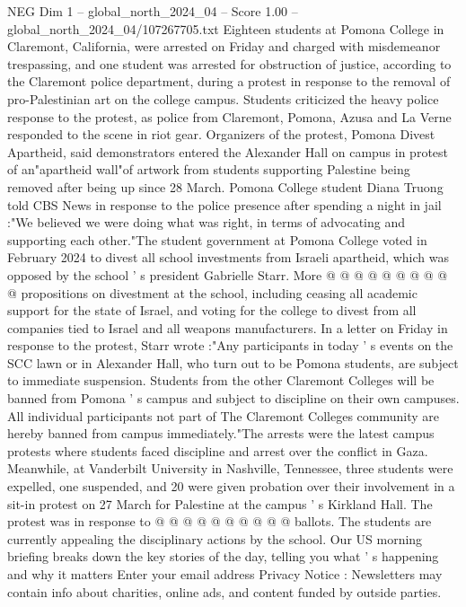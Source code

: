 \begin{textsample}{NEG Dim 1 – global\_north\_2024\_04 – Score 1.00 – global\_north\_2024\_04/107267705.txt}  \label{ex:f1_neg_252}
Eighteen students at Pomona College in Claremont, California, were arrested on Friday and charged with misdemeanor trespassing, and one student was arrested for obstruction of justice, according to the Claremont police department, during a protest in response to the removal of pro-Palestinian art on the college campus.
Students criticized the heavy police response to the protest, as police from Claremont, Pomona, Azusa and La Verne responded to the scene in riot gear.
Organizers of the protest, Pomona Divest Apartheid, said demonstrators entered the Alexander Hall on campus in protest of an"apartheid wall"of artwork from students supporting Palestine being removed after being up since 28 March.
Pomona College student Diana Truong told CBS News in response to the police presence after spending a night in jail :"We believed we were doing what was right, in terms of advocating and supporting each other."The student government at Pomona College voted in February 2024 to divest all school investments from Israeli apartheid, which was opposed by the school ' s president Gabrielle Starr.
More @ @ @ @ @ @ @ @ @ @ propositions on divestment at the school, including ceasing all academic support for the state of Israel, and voting for the college to divest from all companies tied to Israel and all weapons manufacturers.
In a letter on Friday in response to the protest, Starr wrote :"Any participants in today ' s events on the SCC lawn or in Alexander Hall, who turn out to be Pomona students, are subject to immediate suspension.
Students from the other Claremont Colleges will be banned from Pomona ' s campus and subject to discipline on their own campuses.
All individual participants not part of The Claremont Colleges community are hereby banned from campus immediately."The arrests were the latest campus protests where students faced discipline and arrest over the conflict in Gaza.
Meanwhile, at Vanderbilt University in Nashville, Tennessee, three students were expelled, one suspended, and 20 were given probation over their involvement in a sit-in protest on 27 March for Palestine at the campus ' s Kirkland Hall.
The protest was in response to @ @ @ @ @ @ @ @ @ @ ballots.
The students are currently appealing the disciplinary actions by the school.
Our US morning briefing breaks down the key stories of the day, telling you what ' s happening and why it matters Enter your email address Privacy Notice : Newsletters may contain info about charities, online ads, and content funded by outside parties.

\end{textsample}
